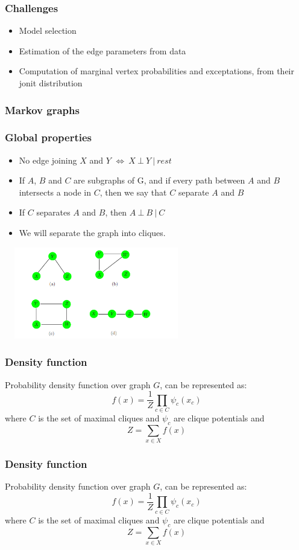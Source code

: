 \documentclass{beamer}
\begin{document}
\begin{frame}
\frametitle{Challenges}
  \begin{itemize}
      \item Model selection
      \item Estimation of the edge parameters from data
      \item Computation of marginal vertex probabilities and exceptations, from their jonit distribution
  \end{itemize}
\end{frame}
\begin{frame}
\frametitle{Markov graphs}
\end{frame}
\begin{frame}
\frametitle{Global properties}
  \begin{itemize}
      \item No edge joining $X$ and $Y$ $ \Leftrightarrow\ X\ \bot\ Y\ |\ rest$
      \item If $A$, $B$ and $C$ are subgraphs of G, and if every path between $A$ and $B$ intersects a node in $C$, then we say that $C$ separate $A$ and $B$
      \item If $C$ separates $A$ and $B$, then $A\ \bot\ B\ |\ C$
      \item We will separate the graph into
cliques. 
  \end{itemize}
  \includegraphics[width=8cm, height=4cm]{Graphs}
\end{frame}
\begin{frame}
\frametitle{Density function}
Probability density function over graph $G$, can be represented as:
\begin{equation}
f(x)=\frac{1}{Z}\prod_{c \in C}{\psi_c(x_c)}
\end{equation}
where $C$ is the set of maximal cliques and $\psi_c$ are clique potentials and \begin{equation}
Z=\sum_{x \in X} f(x)
\end{equation}
\end{frame}
\begin{frame}
\frametitle{Density function}
Probability density function over graph $G$, can be represented as:
\begin{equation}
f(x)=\frac{1}{Z}\prod_{c \in C}{\psi_c(x_c)}
\end{equation}
where $C$ is the set of maximal cliques and $\psi_c$ are clique potentials and 
\begin{equation}
Z=\sum_{x \in X} f(x)
\end{equation}
\end{frame}
\end{document}
